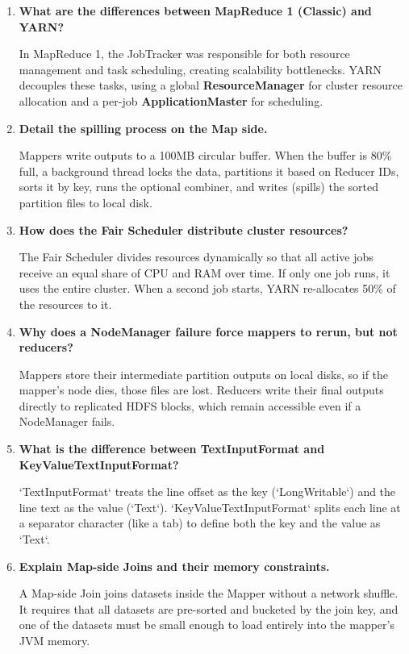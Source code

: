 \documentclass[12pt,a4paper]{article}
\newcommand{\Q}[1]{\textbf{#1}\par\noindent\ignorespaces}
\begin{document}
\begin{tcolorbox}[exambox, title={\textbf{Frequently Asked / Viva Questions}}]
\begin{enumerate}[leftmargin=*, topsep=0pt, label=\textbf{Q\arabic*.}, itemsep=5pt]
  \item \Q{What are the differences between MapReduce 1 (Classic) and YARN?}
        In MapReduce 1, the JobTracker was responsible for both resource management and task scheduling, creating scalability bottlenecks. YARN decouples these tasks, using a global \textbf{ResourceManager} for cluster resource allocation and a per-job \textbf{ApplicationMaster} for scheduling.
        
  \item \Q{Detail the spilling process on the Map side.}
        Mappers write outputs to a 100MB circular buffer. When the buffer is 80\% full, a background thread locks the data, partitions it based on Reducer IDs, sorts it by key, runs the optional combiner, and writes (spills) the sorted partition files to local disk.
        
  \item \Q{How does the Fair Scheduler distribute cluster resources?}
        The Fair Scheduler divides resources dynamically so that all active jobs receive an equal share of CPU and RAM over time. If only one job runs, it uses the entire cluster. When a second job starts, YARN re-allocates 50\% of the resources to it.
        
  \item \Q{Why does a NodeManager failure force mappers to rerun, but not reducers?}
        Mappers store their intermediate partition outputs on local disks, so if the mapper's node dies, those files are lost. Reducers write their final outputs directly to replicated HDFS blocks, which remain accessible even if a NodeManager fails.
        
  \item \Q{What is the difference between TextInputFormat and KeyValueTextInputFormat?}
        `TextInputFormat` treats the line offset as the key (`LongWritable`) and the line text as the value (`Text`). `KeyValueTextInputFormat` splits each line at a separator character (like a tab) to define both the key and the value as `Text`.
        
  \item \Q{Explain Map-side Joins and their memory constraints.}
        A Map-side Join joins datasets inside the Mapper without a network shuffle. It requires that all datasets are pre-sorted and bucketed by the join key, and one of the datasets must be small enough to load entirely into the mapper's JVM memory.
        

\end{enumerate}
\end{tcolorbox}
\end{document}
